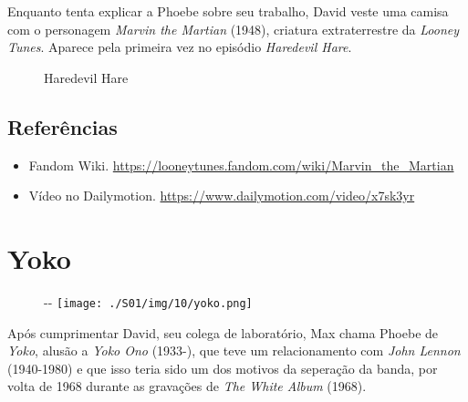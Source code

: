 Enquanto tenta explicar a Phoebe sobre seu trabalho, David veste uma
camisa com o personagem \emph{Marvin the Martian} (1948), criatura
extraterrestre da \emph{Looney Tunes}. Aparece pela primeira vez no
episódio \emph{Haredevil Hare}.

\begin{figure}
  \centering
    \caption{Haredevil Hare\label{fig:haredevil-hare}}
\end{figure}

\hypertarget{referuxeancias-2}{%
\subsection{Referências}\label{referuxeancias-2}}

\begin{itemize}
\tightlist
\item
  \sloppy Fandom Wiki. \url{https://looneytunes.fandom.com/wiki/Marvin_the_Martian}
\item
  \sloppy Vídeo no Dailymotion. \url{https://www.dailymotion.com/video/x7sk3yr}
\end{itemize}

\hypertarget{yoko}{%
\section{Yoko}\label{yoko}}

\begin{figure}[!ht]
  \begin{adjustwidth}{-\oddsidemargin-1in}{-\rightmargin}
    \centering
    \texttt{[image: ./S01/img/10/yoko.png]}
  \end{adjustwidth}
\end{figure}

Após cumprimentar David, seu colega de laboratório, Max chama Phoebe de
\emph{Yoko}, alusão a \emph{Yoko Ono} (1933-), que teve um
relacionamento com \emph{John Lennon} (1940-1980) e que isso teria sido
um dos motivos da seperação da banda, por volta de 1968 durante as
gravações de \emph{The White Album} (1968).

